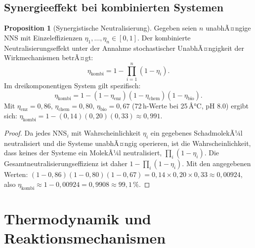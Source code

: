 ﻿\documentclass[12pt,a4paper]{article}
\theoremstyle{definition}
\newtheorem{proposition}{Proposition}[section]
\theoremstyle{remark}
\begin{document}
\subsection{Synergieeffekt bei kombinierten Systemen}

\begin{proposition}[Synergistische Neutralisierung]
\label{prop:synergie}
Gegeben seien $n$ unabhÃ¤ngige NNS mit Einzeleffizienzen
$\eta_1, \ldots, \eta_n \in [0,1]$. Der kombinierte Neutralisierungseffekt
unter der Annahme stochastischer UnabhÃ¤ngigkeit der Wirkmechanismen betrÃ¤gt:
\begin{equation}
  \eta_{\text{kombi}} = 1 - \prod_{i=1}^{n}(1-\eta_i).
  \label{eq:synergie}
\end{equation}
Im dreikomponentigen System gilt spezifisch:
\begin{equation}
  \eta_{\text{kombi}} = 1 - (1-\eta_{\text{enz}})(1-\eta_{\text{chem}})(1-\eta_{\text{bio}}).
  \label{eq:synergie3}
\end{equation}
Mit $\eta_{\text{enz}} = 0{,}86$, $\eta_{\text{chem}} = 0{,}80$,
$\eta_{\text{bio}} = 0{,}67$ (72\,h-Werte bei 25\,Â°C, pH 8.0) ergibt sich:
$\eta_{\text{kombi}} = 1 - (0{,}14)(0{,}20)(0{,}33) \approx 0{,}991$.
\end{proposition}

\begin{proof}
Da jedes NNS$_i$ mit Wahrscheinlichkeit $\eta_i$ ein gegebenes SchadmolekÃ¼l
neutralisiert und die Systeme unabhÃ¤ngig operieren, ist die Wahrscheinlichkeit,
dass keines der Systeme ein MolekÃ¼l neutralisiert, $\prod_i(1-\eta_i)$.
Die Gesamtneutralisierungseffizienz ist daher $1 - \prod_i(1-\eta_i)$.
Mit den angegebenen Werten:
$(1-0{,}86)(1-0{,}80)(1-0{,}67) = 0{,}14 \times 0{,}20 \times 0{,}33
\approx 0{,}00924$, also
$\eta_{\text{kombi}} \approx 1 - 0{,}00924 = 0{,}9908 \approx 99{,}1\,\%$.\hfill
\end{proof}

\section{Thermodynamik und Reaktionsmechanismen}
\label{sec:mechanismen}
\end{document}
